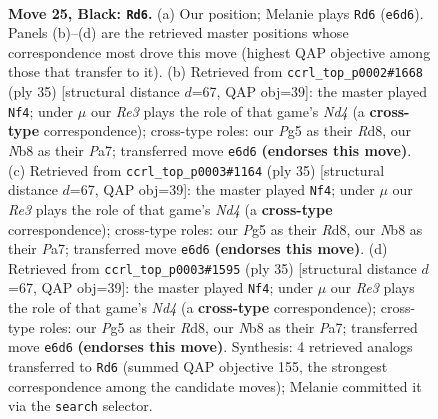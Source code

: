 \documentclass[11pt]{article}
\begin{document}
\clearpage

\begin{figure}[p]\centering
\begin{subfigure}{0.46\textwidth}\centering
\resizebox{\linewidth}{!}{%
\newchessgame
\chessboard[
  setfen={rnb5/pp2q1k1/2p1r1p1/6pp/2BPN3/P4PP1/1P2R2P/2RQ2K1 b - - 0 25},
  showmover=false,
  pgfstyle=straightmove, color=movearrow, markmove={e6-d6}
]}
\caption{}
\end{subfigure}\hfill
\begin{subfigure}{0.46\textwidth}\centering
\resizebox{\linewidth}{!}{%
\newchessgame
\chessboard[
  setfen={r2r2k1/p1q1pp1p/2p1b1p1/2Nn4/2BQ2P1/1P3P2/P1P4P/2KR3R b - - 2 18},
  showmover=false,
  pgfstyle=straightmove, color=movearrow, markmove={d5-f4}
]}
\caption{}
\end{subfigure}
\\[4pt]
\begin{subfigure}{0.46\textwidth}\centering
\resizebox{\linewidth}{!}{%
\newchessgame
\chessboard[
  setfen={r2r2k1/p1q1pp1p/2p1b1p1/2Nn4/2BQ2P1/1P3P2/P1P4P/2KR3R b - - 2 18},
  showmover=false,
  pgfstyle=straightmove, color=movearrow, markmove={d5-f4}
]}
\caption{}
\end{subfigure}\hfill
\begin{subfigure}{0.46\textwidth}\centering
\resizebox{\linewidth}{!}{%
\newchessgame
\chessboard[
  setfen={r2r2k1/p1q1pp1p/2p1b1p1/2Nn4/2BQ2P1/1P3P2/P1P4P/2KR3R b - - 2 18},
  showmover=false,
  pgfstyle=straightmove, color=movearrow, markmove={d5-f4}
]}
\caption{}
\end{subfigure}
\caption{\textbf{Move 25, Black: \texttt{Rd6}.} (a) Our position; Melanie plays \texttt{Rd6} (\texttt{e6d6}). Panels (b)--(d) are the retrieved master positions whose correspondence most drove this move (highest QAP objective among those that transfer to it). (b) Retrieved from \texttt{ccrl\_top\_p0002\#1668} (ply 35) [structural distance $d$=67, QAP obj=39]: the master played \texttt{Nf4}; under $\mu$ our \emph{Re3} plays the role of that game's \emph{Nd4} (a \textbf{cross-type} correspondence); cross-type roles: our \emph{P}g5 as their \emph{R}d8, our \emph{N}b8 as their \emph{P}a7; transferred move \texttt{e6d6} \textbf{(endorses this move)}. (c) Retrieved from \texttt{ccrl\_top\_p0003\#1164} (ply 35) [structural distance $d$=67, QAP obj=39]: the master played \texttt{Nf4}; under $\mu$ our \emph{Re3} plays the role of that game's \emph{Nd4} (a \textbf{cross-type} correspondence); cross-type roles: our \emph{P}g5 as their \emph{R}d8, our \emph{N}b8 as their \emph{P}a7; transferred move \texttt{e6d6} \textbf{(endorses this move)}. (d) Retrieved from \texttt{ccrl\_top\_p0003\#1595} (ply 35) [structural distance $d$=67, QAP obj=39]: the master played \texttt{Nf4}; under $\mu$ our \emph{Re3} plays the role of that game's \emph{Nd4} (a \textbf{cross-type} correspondence); cross-type roles: our \emph{P}g5 as their \emph{R}d8, our \emph{N}b8 as their \emph{P}a7; transferred move \texttt{e6d6} \textbf{(endorses this move)}. Synthesis: 4 retrieved analogs transferred to \texttt{Rd6} (summed QAP objective 155, the strongest correspondence among the candidate moves); Melanie committed it via the \texttt{search} selector.}
\label{fig:thought-m49}
\end{figure}
\end{document}
